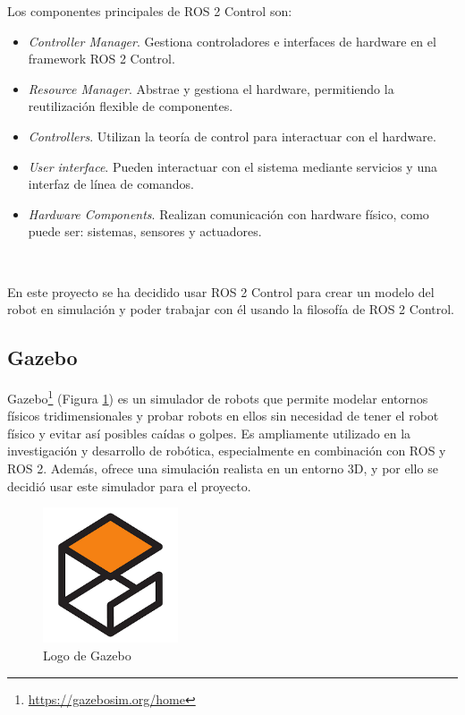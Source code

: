 Los componentes principales de ROS 2 Control son:

\begin{itemize}
	\item\textit{Controller Manager}. Gestiona controladores e interfaces de hardware en el framework ROS 2 Control.
	\item \textit{Resource Manager}. Abstrae y gestiona el hardware, permitiendo la reutilización flexible de componentes.
	\item \textit{Controllers}. Utilizan la teoría de control para interactuar con el hardware.
	\item \textit{User interface}. Pueden interactuar con el sistema mediante servicios y una interfaz de línea de comandos.
	\item \textit{Hardware Components}. Realizan comunicación con hardware físico, como puede ser: sistemas, sensores y actuadores.
\end{itemize}\

En este proyecto se ha decidido usar ROS 2 Control para crear un modelo del robot en simulación y poder trabajar con él usando la filosofía de ROS 2 Control.


\subsection{Gazebo}

Gazebo\footnote{\url{https://gazebosim.org/home}} (Figura \ref{fig:gazebo}) es un simulador de robots que permite modelar entornos físicos tridimensionales y probar robots en ellos sin necesidad de tener el robot físico y evitar así posibles caídas o golpes. Es ampliamente utilizado en la investigación y desarrollo de robótica, especialmente en combinación con ROS y ROS 2. Además, ofrece una simulación realista en un entorno 3D, y por ello se decidió usar este simulador para el proyecto.

\begin{figure} [h!]
	\begin{center}
		\includegraphics[width=4cm]{figs/gazebo.png}
	\end{center}
	\caption{Logo de Gazebo} %
	\label{fig:gazebo}
\end{figure}

